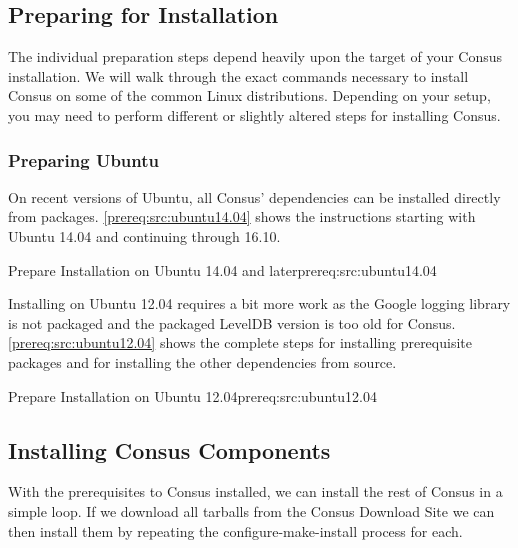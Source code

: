 \subsection{Preparing for Installation}

The individual preparation steps depend heavily upon the target of your Consus
installation.  We will walk through the exact commands necessary to install
Consus on some of the common Linux distributions.  Depending on your setup, you
may need to perform different or slightly altered steps for installing Consus.


\subsubsection*{Preparing Ubuntu}

On recent versions of Ubuntu, all Consus' dependencies can be installed directly
from packages.  \cref{prereq:src:ubuntu14.04} shows the instructions starting with Ubuntu
14.04 and continuing through 16.10.

%
{Prepare Installation on Ubuntu 14.04 and later}{prereq:src:ubuntu14.04}

Installing on Ubuntu 12.04 requires a bit more work as the Google logging
library is not packaged and the packaged LevelDB version is too old for Consus.
\cref{prereq:src:ubuntu12.04} shows the complete steps for installing
prerequisite packages and for installing the other dependencies from source.

%
{Prepare Installation on Ubuntu 12.04}{prereq:src:ubuntu12.04}

\subsection{Installing Consus Components}

With the prerequisites to Consus installed, we can install the rest of Consus in
a simple loop.  If we download all tarballs from the Consus Download Site %
we can then install them by repeating the configure-make-install process for
each.

